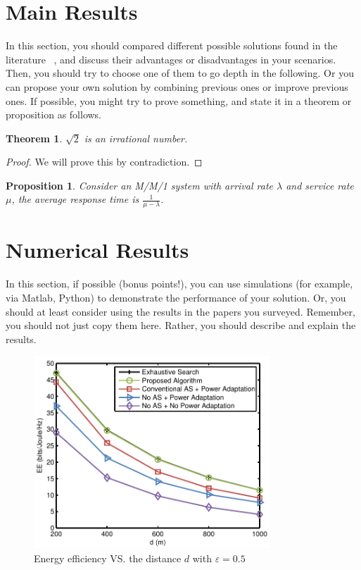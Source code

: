 \documentclass[10pt]{article}
\newtheorem{proposition}{Proposition}
\newtheorem{theorem}{Theorem}
\begin{document}
\section{Main Results}
In this section, you should compared different possible solutions found in the literature \cite{zhou2015energy}~\cite{zhou2014energy}, and discuss their advantages or disadvantages in your scenarios. Then, you should try to choose one of them to go depth in the following. Or you can propose your own solution by combining previous ones or improve previous ones. If possible, you might try to prove something, and state it in a theorem or proposition as follows.
\begin{theorem}
	$\sqrt{2}$ is an irrational number.
\end{theorem}
\begin{proof}
	We will prove this by contradiction.
\end{proof}
\begin{proposition}
	Consider an M/M/1 system with arrival rate $\lambda$ and service rate $\mu$, the average response time is $\frac{1}{\mu-\lambda}$.
\end{proposition}


\section{Numerical Results}
In this section, if possible (bonus points!), you can use simulations (for example, via Matlab, Python) to demonstrate the performance of your solution. Or, you should at least consider using the results in the papers you surveyed. Remember, you should not just copy them here. Rather, you should describe and explain the results.

\begin{figure}[t]
\centering
\includegraphics[width=3.5in]{Fig_EE_color.pdf}
\caption{Energy efficiency VS. the  distance $d$ with $\varepsilon = 0.5$ \label{fig:EE}}
\end{figure}
\end{document}
